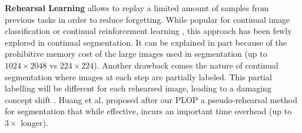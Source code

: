 \noindent\textbf{Rehearsal Learning} \citep{robins1995catastrophicforgetting} allows to replay a
limited amount of samples from previous tasks in order to reduce forgetting. While popular for
continual image classification
\citep{rebuffi2017icarl,castro2018end_to_end_inc_learn,chaudhry2019tinyepisodicmemories,hayes2020remind,iscen2020incrementalfeatureadaptation,kemker2018fearnet,shin2017deep_generative_replay,liu2020mnemonics,chaudhry2019tinyepisodicmemories}
or continual reinforcement learning \citep{traore2019discorl}, this approach has been fewly explored
in continual segmentation. It can be explained in part because of the prohibitive memory cost of the
large images used in segmentation (up to $1024 \times 2048$ vs $224 \times 224$). Another drawback
comes the nature of continual segmentation where images at each step are partially labeled. This
partial labelling will be different for each rehearsed image, leading to a damaging concept shift
\citep{morenotorresa2012datasetshift,lesort2021driftanalysis}. Huang et al.
\citep{huang2021halfrealhalffake} proposed after our PLOP a pseudo-rehearsal method for segmentation
that while effective, incurs an important time overhead (up to $3\times$ longer).

